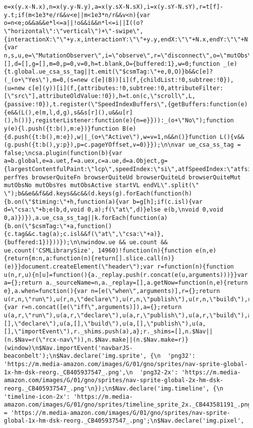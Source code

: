 \documentclass[
]{article}
\begin{document}
\begin{verbatim}
e=x(y.x-N.x),n=x(y.y-N.y),a=x(y.sX-N.sX),i=x(y.sY-N.sY),r=t[f]-y.t;if(m<1e3*e/r&&v<e||m<1e3*n/r&&v<n){var o=n<e;o&&a&&e*l<=a||!o&&i&&n*l<=i||I((o?\"horizontal\":\"vertical\")+\"-swipe\",{interactionX:\"\"+y.x,interactionY:\"\"+y.y,endX:\"\"+N.x,endY:\"\"+N.y},y.e)}}}n(a,e,i,t),n(a,\"touchstart\",C,t),n(a,\"touchmove\",D,t),n(a,\"touchend\",E,t)});csa.plugin(function(t){var n,s,u,e=\"MutationObserver\",i=\"observe\",r=\"disconnect\",o=\"mutObs\",c=t.global,a=c.document,f=a.body||a.documentElement,b=Date.now,l=[],d=[],g=[],m=0,p=0,v=0,h=t.blank,O={buffered:1},w=0;function _(e){t.global.ue_csa_ss_tag||t.emit(\"$csmTag:\"+e,0,O)}b&&c[e]?(_(o+\"Yes\"),m=0,(s=new c[e](B))[i](f,{childList:!0,subtree:!0}),(u=new c[e](y))[i](f,{attributes:!0,subtree:!0,attributeFilter:[\"src\"],attributeOldValue:!0}),h=t.on(c,\"scroll\",L,{passive:!0}),t.register(\"SpeedIndexBuffers\",{getBuffers:function(e){e&&(L(),e(m,l,d,g),s&&s[r](),u&&u[r](),h())},registerListener:function(e){n=e}})):_(o+\"No\");function y(e){l.push({t:b(),m:e})}function B(e){d.push({t:b(),m:e}),w||_(o+\"Active\"),w=v=1,n&&n()}function L(){v&&(g.push({t:b(),y:p}),p=c.pageYOffset,v=0)}});\n\nvar ue_csa_ss_tag = false;\ncsa.plugin(function(b){var a=b.global,e=a.uet,f=a.uex,c=a.ue,d=a.Object,g={largestContentfulPaint:\"lcp\",speedIndex:\"si\",atfSpeedIndex:\"atfsi\",visuallyLoaded50:\"vl50\",visuallyLoaded90:\"vl90\",visuallyLoaded100:\"vl100\"},k=\"perfNo perfYes browserQuiteFn browserQuiteUd browserQuiteLd browserQuiteMut mutObsNo mutObsYes mutObsActive startVL endVL\".split(\" \");b&&e&&f&&d.keys&&c&&(d.keys(g).forEach(function(h){b.on(\"$timing:\"+h,function(a){var b=g[h];if(c.isl){var d=\"csa:\"+b;e(b,d,void 0,a);f(\"at\",d)}else e(b,\nvoid 0,void 0,a)})}),a.ue_csa_ss_tag||k.forEach(function(a){b.on(\"$csmTag:\"+a,function(){c.tag&&c.tag(a);c.isl&&f(\"at\",\"csa:\"+a)},{buffered:1})}))});\n\nwindow.ue && ue.count && ue.count('CSMLibrarySize', 14960)!function(n){function e(n,e){return{m:n,a:function(n){return[].slice.call(n)}(e)}}document.createElement(\"header\");var r=function(n){function u(n,r,u){n[u]=function(){a._replay.push(r.concat(e(u,arguments)))}}var a={};return a._sourceName=n,a._replay=[],a.getNow=function(n,e){return e},a.when=function(){var n=[e(\"when\",arguments)],r={};return u(r,n,\"run\"),u(r,n,\"declare\"),u(r,n,\"publish\"),u(r,n,\"build\"),r.depends=n,r.iff=function(){var r=n.concat([e(\"iff\",arguments)]),a={};return u(a,r,\"run\"),u(a,r,\"declare\"),u(a,r,\"publish\"),u(a,r,\"build\"),a},r},u(a,[],\"declare\"),u(a,[],\"build\"),u(a,[],\"publish\"),u(a,[],\"importEvent\"),r._shims.push(a),a};r._shims=[],n.$Nav||(n.$Nav=r(\"rcx-nav\")),n.$Nav.make||(n.$Nav.make=r)}(window)\n$Nav.importEvent('navbarJS-beaconbelt');\n$Nav.declare('img.sprite', {\n  'png32': 'https://m.media-amazon.com/images/G/01/gno/sprites/nav-sprite-global-1x-hm-dsk-reorg._CB405937547_.png',\n  'png32-2x': 'https://m.media-amazon.com/images/G/01/gno/sprites/nav-sprite-global-2x-hm-dsk-reorg._CB405937547_.png'\n});\n$Nav.declare('img.timeline', {\n  'timeline-icon-2x': 'https://m.media-amazon.com/images/G/01/gno/sprites/timeline_sprite_2x._CB443581191_.png'\n});\nwindow._navbarSpriteUrl = 'https://m.media-amazon.com/images/G/01/gno/sprites/nav-sprite-global-1x-hm-dsk-reorg._CB405937547_.png';\n$Nav.declare('img.pixel', 
\end{verbatim}
\end{document}
